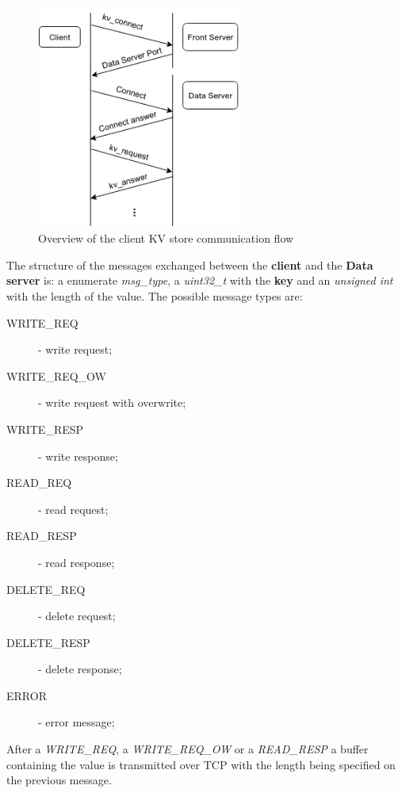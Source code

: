 \documentclass[12pt]{article} %
\begin{document}
\begin{figure}[H]
\centering
\includegraphics[width=0.6\textwidth]{./Pictures/CommunicationFlow.png}
\caption{Overview of the client KV store communication flow}\label{fig:Comms}
\end{figure}

The structure of the messages exchanged between the \textbf{client} and the \textbf{Data server} 
is:  a  enumerate \emph{msg\_type}, a \emph{uint32\_t} with the \textbf{key} and an \emph{unsigned int} 
with the length of the value. The possible message types are:
\begin{description}
    \item[WRITE\_REQ] - write request;
    \item[WRITE\_REQ\_OW] - write request with overwrite;
    \item[WRITE\_RESP] - write response;
    \item[READ\_REQ] - read request;
    \item[READ\_RESP] - read response;
    \item[DELETE\_REQ] - delete request;
    \item[DELETE\_RESP] - delete response;
    \item[ERROR] - error message;
\end{description}
After a \emph{WRITE\_REQ}, a \emph{WRITE\_REQ\_OW} or a \emph{READ\_RESP} a buffer containing 
the value is transmitted over TCP with the length being specified on the previous 
message.

\end{document}
